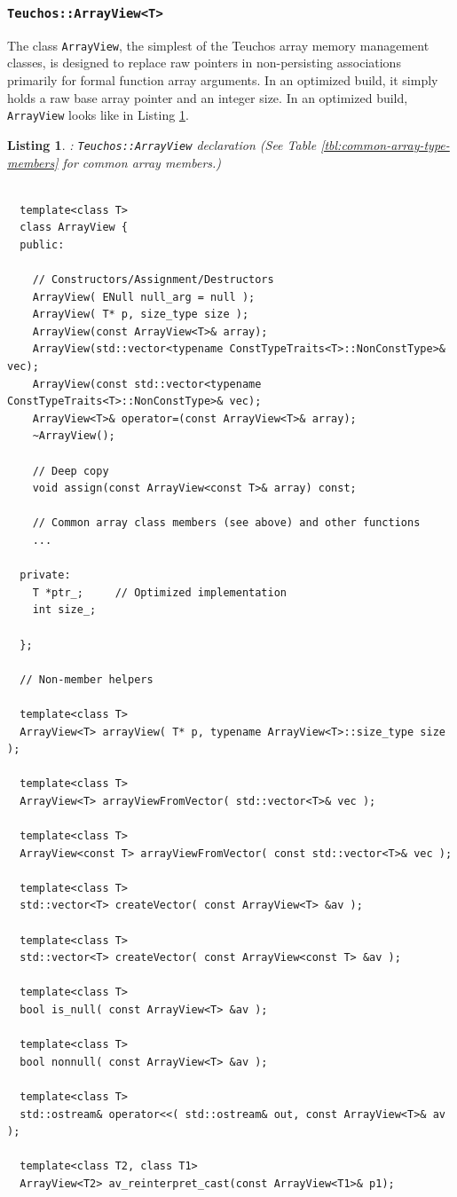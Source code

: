 \documentclass[pdf,ps2pdf,11pt]{SANDreport}
\newtheorem{listing}{Listing}
\begin{document}
%
{}\subsubsection{\texttt{Teuchos::ArrayView<T>}}
%

The class {}\texttt{ArrayView}, the simplest of the Teuchos array
memory management classes, is designed to replace raw pointers in
non-persisting associations primarily for formal function array
arguments.  In an optimized build, it simply holds a raw base array
pointer and an integer size.  In an optimized build,
{}\texttt{ArrayView} looks like in Listing {}\ref{listing:ArrayView}.

{}\begin{listing}: {}\texttt{Teuchos::ArrayView} declaration (See
Table {}\ref{tbl:common-array-type-members} for common array members.)
\label{listing:ArrayView}
{\small\begin{verbatim}

  template<class T>
  class ArrayView {
  public:

    // Constructors/Assignment/Destructors
    ArrayView( ENull null_arg = null );
    ArrayView( T* p, size_type size );
    ArrayView(const ArrayView<T>& array);
    ArrayView(std::vector<typename ConstTypeTraits<T>::NonConstType>& vec);
    ArrayView(const std::vector<typename ConstTypeTraits<T>::NonConstType>& vec);
    ArrayView<T>& operator=(const ArrayView<T>& array);
    ~ArrayView();

    // Deep copy  
    void assign(const ArrayView<const T>& array) const;

    // Common array class members (see above) and other functions
    ...

  private:
    T *ptr_;     // Optimized implementation
    int size_;

  };

  // Non-member helpers

  template<class T>
  ArrayView<T> arrayView( T* p, typename ArrayView<T>::size_type size );

  template<class T>
  ArrayView<T> arrayViewFromVector( std::vector<T>& vec );

  template<class T>
  ArrayView<const T> arrayViewFromVector( const std::vector<T>& vec );

  template<class T>
  std::vector<T> createVector( const ArrayView<T> &av );

  template<class T>
  std::vector<T> createVector( const ArrayView<const T> &av );

  template<class T>
  bool is_null( const ArrayView<T> &av );

  template<class T>
  bool nonnull( const ArrayView<T> &av );

  template<class T>
  std::ostream& operator<<( std::ostream& out, const ArrayView<T>& av );

  template<class T2, class T1>
  ArrayView<T2> av_reinterpret_cast(const ArrayView<T1>& p1);

\end{verbatim}}
\end{listing}
\end{document}
